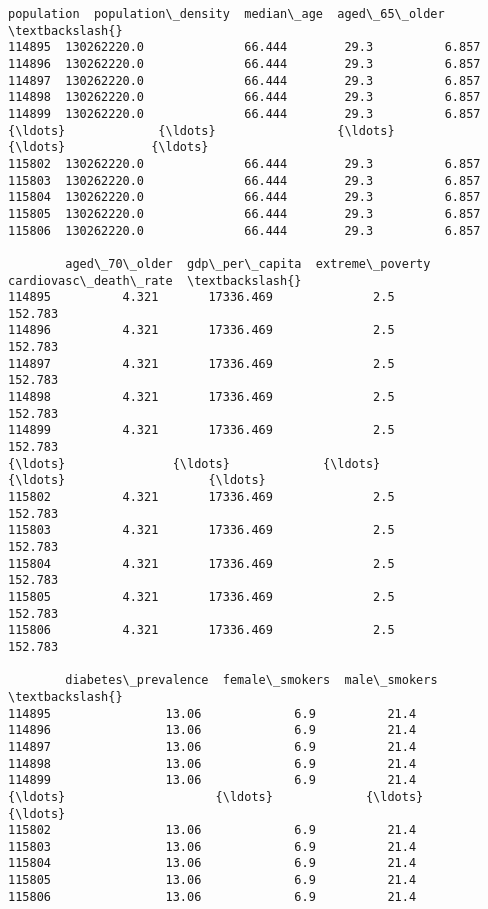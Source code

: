 \documentclass[11pt]{article}
\begin{document}
\begin{tcolorbox}[breakable, size=fbox, boxrule=.5pt, pad at break*=1mm, opacityfill=0]
\begin{Verbatim}[commandchars=\\\{\}]
         population  population\_density  median\_age  aged\_65\_older  \textbackslash{}
114895  130262220.0              66.444        29.3          6.857
114896  130262220.0              66.444        29.3          6.857
114897  130262220.0              66.444        29.3          6.857
114898  130262220.0              66.444        29.3          6.857
114899  130262220.0              66.444        29.3          6.857
{\ldots}             {\ldots}                 {\ldots}         {\ldots}            {\ldots}
115802  130262220.0              66.444        29.3          6.857
115803  130262220.0              66.444        29.3          6.857
115804  130262220.0              66.444        29.3          6.857
115805  130262220.0              66.444        29.3          6.857
115806  130262220.0              66.444        29.3          6.857

        aged\_70\_older  gdp\_per\_capita  extreme\_poverty  cardiovasc\_death\_rate  \textbackslash{}
114895          4.321       17336.469              2.5                152.783
114896          4.321       17336.469              2.5                152.783
114897          4.321       17336.469              2.5                152.783
114898          4.321       17336.469              2.5                152.783
114899          4.321       17336.469              2.5                152.783
{\ldots}               {\ldots}             {\ldots}              {\ldots}                    {\ldots}
115802          4.321       17336.469              2.5                152.783
115803          4.321       17336.469              2.5                152.783
115804          4.321       17336.469              2.5                152.783
115805          4.321       17336.469              2.5                152.783
115806          4.321       17336.469              2.5                152.783

        diabetes\_prevalence  female\_smokers  male\_smokers  \textbackslash{}
114895                13.06             6.9          21.4
114896                13.06             6.9          21.4
114897                13.06             6.9          21.4
114898                13.06             6.9          21.4
114899                13.06             6.9          21.4
{\ldots}                     {\ldots}             {\ldots}           {\ldots}
115802                13.06             6.9          21.4
115803                13.06             6.9          21.4
115804                13.06             6.9          21.4
115805                13.06             6.9          21.4
115806                13.06             6.9          21.4


\end{Verbatim}
\end{tcolorbox}
\end{document}
